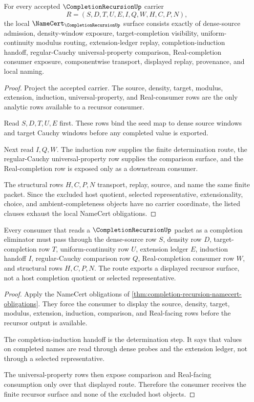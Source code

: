 \begin{theorem}
\label{thm:completion-recursion-namecert-obligations}
For every accepted $\CompletionRecursionUp$ carrier
$$
R=(S,D,T,U,E,I,Q,W,H,C,P,N),
$$
the local $\NameCert_{\CompletionRecursionUp}$ surface consists exactly of dense-source admission, density-window exposure, target-completion visibility, uniform-continuity modulus routing, extension-ledger replay, completion-induction handoff, regular-Cauchy universal-property comparison, Real-completion consumer exposure, componentwise transport, displayed replay, provenance, and local naming.
\end{theorem}
\begin{proof}
Project the accepted carrier. The source, density, target, modulus, extension, induction, universal-property, and Real-consumer rows are the only analytic rows available to a recursor consumer.

Read $S,D,T,U,E$ first. These rows bind the seed map to dense source windows and target Cauchy windows before any completed value is exported.

Next read $I,Q,W$. The induction row supplies the finite determination route, the regular-Cauchy universal-property row supplies the comparison surface, and the Real-completion row is exposed only as a downstream consumer.

The structural rows $H,C,P,N$ transport, replay, source, and name the same finite packet. Since the excluded host quotient, selected representative, extensionality, choice, and ambient-completeness objects have no carrier coordinate, the listed clauses exhaust the local NameCert obligations.
\end{proof}

\begin{theorem}
\label{thm:completion-recursion-universal-route}
Every consumer that reads a $\CompletionRecursionUp$ packet as a completion eliminator must pass through the dense-source row $S$, density row $D$, target-completion row $T$, uniform-continuity row $U$, extension ledger $E$, induction handoff $I$, regular-Cauchy comparison row $Q$, Real-completion consumer row $W$, and structural rows $H,C,P,N$. The route exports a displayed recursor surface, not a host completion quotient or selected representative.
\end{theorem}
\begin{proof}
Apply the NameCert obligations of \autoref{thm:completion-recursion-namecert-obligations}. They force the consumer to display the source, density, target, modulus, extension, induction, comparison, and Real-facing rows before the recursor output is available.

The completion-induction handoff is the determination step. It says that values on completed names are read through dense probes and the extension ledger, not through a selected representative.

The universal-property rows then expose comparison and Real-facing consumption only over that displayed route. Therefore the consumer receives the finite recursor surface and none of the excluded host objects.
\end{proof}

